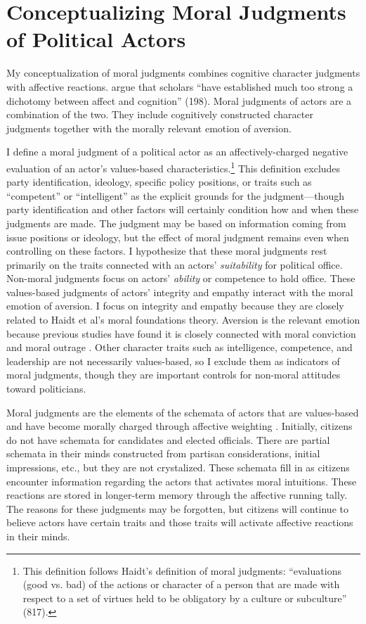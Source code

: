 \section{Conceptualizing Moral Judgments of Political Actors}
My conceptualization of moral judgments combines cognitive character judgments with affective reactions.  argue that scholars ``have established much too strong a dichotomy between affect and cognition'' (198). Moral judgments of actors are a combination of the two. They include cognitively constructed character judgments together with the morally relevant emotion of aversion.

I define a moral judgment of a political actor as an affectively-charged negative evaluation of an actor's values-based characteristics.\footnote{This definition follows Haidt's \citeyear{Haidt2001} definition of moral judgments: ``evaluations (good vs. bad) of the actions or character of a person that are made with respect to a set of virtues held to be obligatory by a culture or subculture'' (817).} This definition excludes party identification, ideology, specific policy positions, or traits such as ``competent'' or ``intelligent'' as the explicit grounds for the judgment---though party identification and other factors will certainly condition how and when these judgments are made. The judgment may be based on information coming from issue positions or ideology, but the effect of moral judgment remains even when controlling on these factors. I hypothesize that these moral judgments rest primarily on the traits connected with an actors' \emph{suitability} for political office. Non-moral judgments focus on actors' \emph{ability} or competence to hold office. These values-based judgments of actors' integrity and empathy interact with the moral emotion of aversion. I focus on integrity and empathy because they are closely related to Haidt et al's \cite{Haidt2012,Grahametal2012} moral foundations theory. Aversion is the relevant emotion because previous studies have found it is closely connected with moral conviction \cite{Petersen2010,SkitkaWisneski2011}and moral outrage \cite{SteenbergenEllis2006}. Other character traits such as intelligence, competence, and leadership are not necessarily values-based, so I exclude them as indicators of moral judgments, though they are important controls for non-moral attitudes toward politicians.

Moral judgments are the elements of the schemata of actors that are values-based and have become morally charged through affective weighting \cite{TaberLodgeGlathar2001}. Initially, citizens do not have schemata for candidates and elected officials. There are partial schemata in their minds constructed from partisan considerations, initial impressions, etc., but they are not crystalized. These schemata fill in as citizens encounter information regarding the actors that activates moral intuitions. These reactions are stored in longer-term memory through the affective running tally. The reasons for these judgments may be forgotten, but citizens will continue to believe actors have certain traits and those traits will activate affective reactions in their minds.

